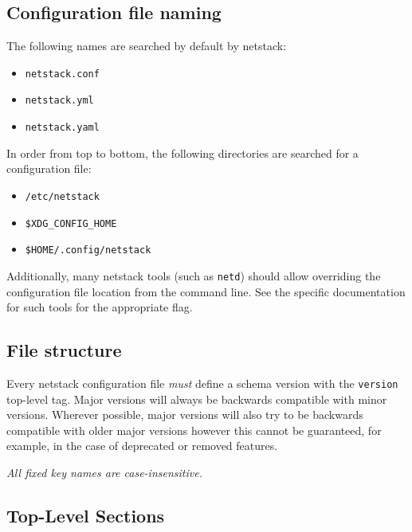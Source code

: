 \begin{appendices}
        \subsection{Configuration file naming}\label{configuration-file-naming}

        The following names are searched by default by netstack:
        \begin{itemize}[noitemsep,leftmargin=2em]
            \item{\texttt{netstack.conf}}
            \item{\texttt{netstack.yml}}
            \item{\texttt{netstack.yaml}}
        \end{itemize}

        In order from top to bottom, the following directories are searched for a configuration file:
        \begin{itemize}[noitemsep,leftmargin=2em]
            \item{\texttt{/etc/netstack}}
            \item{\texttt{\$XDG\_CONFIG\_HOME}}
            \item{\texttt{\$HOME/.config/netstack}}
        \end{itemize}

        Additionally, many netstack tools (such as \texttt{netd}) should allow overriding the configuration file location from the command line. See the specific documentation for such tools for the appropriate flag.

        \vfil

        \subsection{File structure}\label{file-structure}

        Every netstack configuration file \emph{must} define a schema version with the \texttt{version} top-level tag. Major versions will always be backwards compatible with minor versions. Wherever possible, major versions will also try to be backwards compatible with older major versions however this cannot be guaranteed, for example, in the case of deprecated or removed features.

        \emph{All fixed key names are case-insensitive.}

        \subsection{Top-Level Sections}\label{top-level-sections}


\end{appendices}
